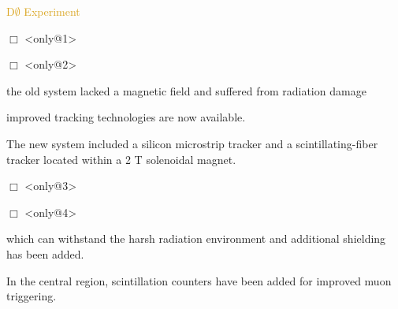\begin{frame}{\textcolor{Goldenrod}{D$\emptyset$ Experiment}}
  \itt
\item[$\Box$]<only@1> 
  
\item[$\Box$]<only@2> 
  {\small
    \itt
  \item \alert{the old system lacked a magnetic field and suffered from radiation
      damage}
  \item improved tracking technologies are now available.\\
  \item The new system included a silicon microstrip tracker and a
    scintillating-fiber tracker located within a 2 T solenoidal
    magnet.
    \tti
  }
\item[$\Box$]<only@3> 
  
\item[$\Box$]<only@4> 
  {\small
    \itt
  \item which can withstand the harsh radiation environment and
    additional shielding has been added.
    
  \item In the central region,
    scintillation counters have been added for improved muon
    triggering.
    \tti
  }
  \tti
\end{frame}



